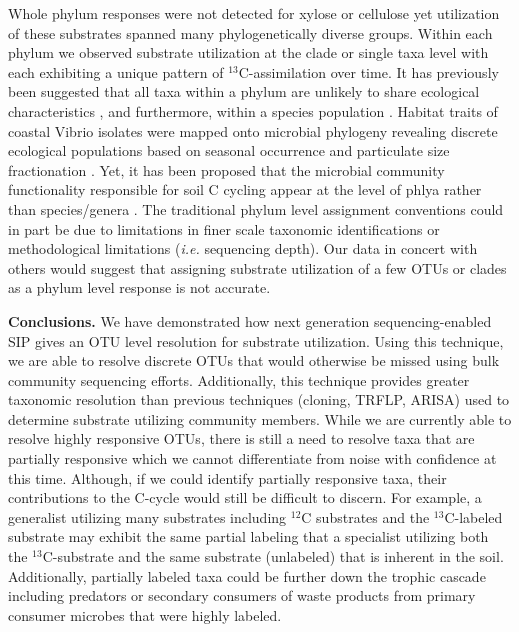 Whole phylum responses were not detected for xylose or cellulose yet
utilization of these substrates spanned many phylogenetically diverse groups.
Within each phylum we observed substrate utilization at the clade or single
taxa level with each exhibiting a unique pattern of $^{13}$C-assimilation over
time. It has previously been suggested that all taxa within a phylum are
unlikely to share ecological characteristics \citep{Fierer_2007}, and
furthermore, within a species population
\citep{Choudoir_2012,Preheim_2011,Hunt_2008}. Habitat traits of coastal Vibrio
isolates were mapped onto microbial phylogeny revealing discrete ecological
populations based on seasonal occurrence and particulate size fractionation
\citep{Preheim_2011,Hunt_2008}. Yet, it has been proposed that the microbial
community functionality responsible for soil C cycling appear at the level of
phlya rather than species/genera \citep{Schimel_2012}. The traditional phylum
level assignment conventions could in part be due to limitations in finer scale
taxonomic identifications or methodological limitations (\textit{i.e.}
sequencing depth). Our data in concert with others
\citep{Goldfarb_2011,Fierer_2007,Choudoir_2012,Preheim_2011,Hunt_2008} would
suggest that assigning substrate utilization of a few OTUs or clades as a
phylum level response is not accurate.

\textbf{Conclusions.} We have demonstrated how next generation
sequencing-enabled SIP gives an OTU level resolution for substrate utilization.
Using this technique, we are able to resolve discrete OTUs that would otherwise
be missed using bulk community sequencing efforts. Additionally, this technique
provides greater taxonomic resolution than previous techniques (cloning, TRFLP,
ARISA) used to determine substrate utilizing community members. While we are
currently able to resolve highly responsive OTUs, there is still a need to
resolve taxa that are partially responsive which we cannot differentiate from
noise with confidence at this time. Although, if we could identify partially
responsive taxa, their contributions to the C-cycle would still be difficult to
discern. For example, a generalist utilizing many substrates including $^{12}$C
substrates and the $^{13}$C-labeled substrate may exhibit the same partial
labeling that a specialist utilizing both the $^{13}$C-substrate and the same
substrate (unlabeled) that is inherent in the soil. Additionally, partially
labeled taxa could be further down the trophic cascade including predators or
secondary consumers of waste products from primary consumer microbes that were
highly labeled.   

